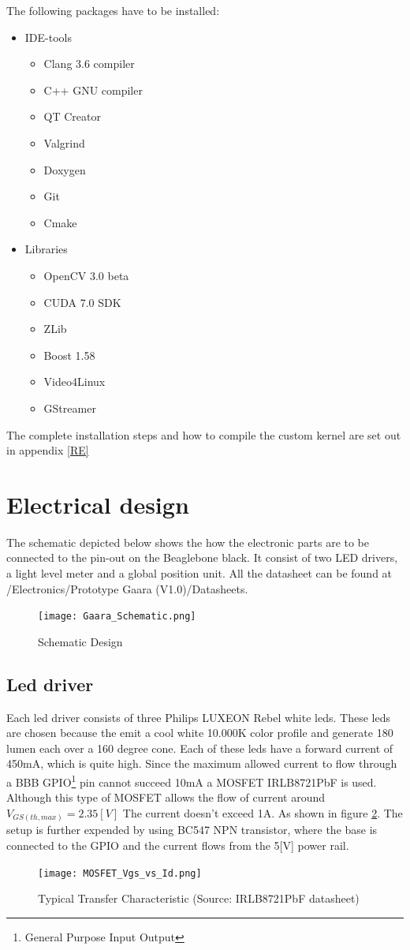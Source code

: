 \documentclass[11pt,fleqn,,a4paper,twoside,openright]{book}
\begin{document}
The following packages have to be installed:
\begin{itemize}
	\item IDE-tools
	\begin{itemize}
		\item Clang 3.6 compiler
		\item C++ GNU compiler
		\item QT Creator
		\item Valgrind
		\item Doxygen
		\item Git
		\item Cmake
	\end{itemize}
	\item Libraries
	\begin{itemize}
		\item OpenCV 3.0 beta
		\item CUDA 7.0 SDK
		\item ZLib
		\item Boost 1.58
		\item Video4Linux
		\item GStreamer
	\end{itemize}
\end{itemize}
The complete installation steps and how to compile the custom kernel are set out in appendix \ref{RE}

\section{Electrical design}
The schematic depicted below shows the how the electronic parts are to be connected to the pin-out on the Beaglebone black. It consist of two LED drivers, a light level meter and a global position unit. All the datasheet can be found at /Electronics/Prototype Gaara (V1.0)/Datasheets.
\begin{figure}[h]
	\texttt{[image: Gaara\_Schematic.png]}
	\caption{Schematic Design}\label{fig:Schematicdesign}
\end{figure}

\subsection{Led driver}
Each led driver consists of three Philips LUXEON Rebel white leds. These  leds are chosen because the emit a cool white 10.000K color profile and generate 180 lumen each over a 160 degree cone. Each of these leds have a forward current of 450mA, which is quite high. Since the maximum allowed current to flow through a BBB GPIO\footnote{General Purpose Input Output} pin cannot succeed 10mA a MOSFET IRLB8721PbF is used. Although this type of MOSFET allows the flow of current around $ V_{GS(th,max)} = 2.35[V] $ The current doesn't exceed 1A. As shown in figure \ref{fig:MosfetVGSvsID}. The setup is further expended by using BC547 NPN transistor, where the base is connected to the GPIO and the current flows from the 5[V] power rail.
\begin{figure}[h]
	\centering
	\texttt{[image: MOSFET\_Vgs\_vs\_Id.png]}
	\caption{Typical Transfer Characteristic (Source: IRLB8721PbF datasheet) }\label{fig:MosfetVGSvsID}
\end{figure}
\end{document}
